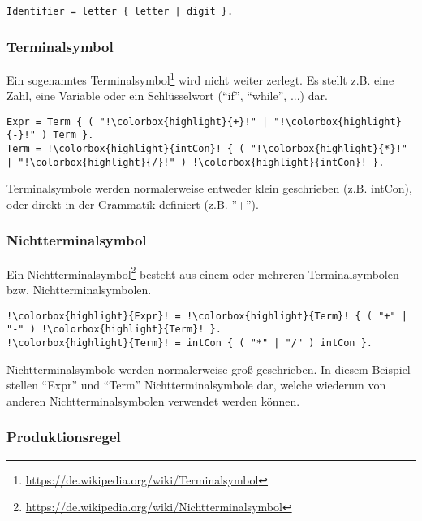 
\begin{lstlisting}[language=EBNF]
Identifier = letter { letter | digit }.
\end{lstlisting}

\newpage

\subsubsection{Terminalsymbol}

Ein sogenanntes Terminalsymbol\footnote{\url{https://de.wikipedia.org/wiki/Terminalsymbol}} wird nicht weiter zerlegt. Es stellt z.B. eine Zahl, eine Variable oder ein Schlüsselwort (``if'', ``while'', ...) dar.

\begin{lstlisting}[language=EBNF, escapechar=!]
Expr = Term { ( "!\colorbox{highlight}{+}!" | "!\colorbox{highlight}{-}!" ) Term }.
Term = !\colorbox{highlight}{intCon}! { ( "!\colorbox{highlight}{*}!" | "!\colorbox{highlight}{/}!" ) !\colorbox{highlight}{intCon}! }.
\end{lstlisting}

Terminalsymbole werden normalerweise entweder klein geschrieben (z.B. intCon), oder direkt in der Grammatik definiert (z.B. ''+'').

\subsubsection{Nichtterminalsymbol}

Ein Nichtterminalsymbol\footnote{\url{https://de.wikipedia.org/wiki/Nichtterminalsymbol}} besteht aus einem oder mehreren Terminalsymbolen bzw. Nichtterminalsymbolen.

\begin{lstlisting}[language=EBNF, escapechar=!]
!\colorbox{highlight}{Expr}! = !\colorbox{highlight}{Term}! { ( "+" | "-" ) !\colorbox{highlight}{Term}! }.
!\colorbox{highlight}{Term}! = intCon { ( "*" | "/" ) intCon }.
\end{lstlisting}

Nichtterminalsymbole werden normalerweise gro\ss{} geschrieben. In diesem Beispiel stellen ``Expr'' und ``Term'' Nichtterminalsymbole dar, welche wiederum von anderen Nichtterminalsymbolen verwendet werden k\"onnen.

\subsubsection{Produktionsregel}

